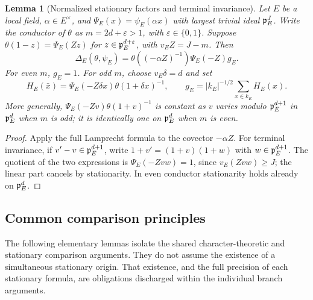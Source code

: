 \documentclass[11pt]{amsart}
\newtheorem{lemma}[theorem]{Lemma}
\theoremstyle{definition}
\theoremstyle{remark}
\begin{document}
\begin{lemma}[Normalized stationary factors and terminal invariance]
\label{U:stationary-factor}
Let $E$ be a local field, $\alpha\in E^\times$, and
$\Psi_E(x)=\psi_E(\alpha x)$ with largest trivial ideal $\mathfrak p_E^J$.
Write the conductor of $\theta$ as $m=2d+\varepsilon>1$, with
$\varepsilon\in\{0,1\}$. Suppose
$\theta(1-z)=\Psi_E(Zz)$ for $z\in\mathfrak p_E^{d+\varepsilon}$,
with $v_E Z=J-m$. Then
\begin{equation}\label{U:normalized-factor}
 \Delta_E(\theta,\psi_E)=
 \theta(( -\alpha Z)^{-1})\Psi_E(-Z)g_E.
\end{equation}
For even $m$, $g_E=1$. For odd $m$, choose $v_E\delta=d$ and set
\begin{equation}\label{U:normalized-residual}
 H_E(\bar x)=\Psi_E(-Z\delta x)\theta(1+\delta x)^{-1},\qquad
 g_E=|k_E|^{-1/2}\sum_{x\in k_E}H_E(x).
\end{equation}
More generally, $\Psi_E(-Zv)\theta(1+v)^{-1}$ is constant as $v$ varies
modulo $\mathfrak p_E^{d+1}$ in $\mathfrak p_E^d$ when $m$ is odd; it is identically
one on $\mathfrak p_E^d$ when $m$ is even.
\end{lemma}
\begin{proof}
Apply the full Lamprecht formula to the covector $-\alpha Z$.
For terminal invariance, if $v'-v\in\mathfrak p_E^{d+1}$, write
$1+v'=(1+v)(1+w)$ with $w\in\mathfrak p_E^{d+1}$. The quotient of the two
expressions is $\Psi_E(-Zvw)=1$, since
$v_E(Zvw)\ge J$; the linear part cancels by stationarity.
In even conductor stationarity holds already on $\mathfrak p_E^d$.
\end{proof}

\subsection{Common comparison principles}\label{U:common-principles}
The following elementary lemmas isolate the shared character-theoretic
and stationary comparison arguments. They do not assume the existence of a simultaneous stationary
origin. That existence, and the full precision of each stationary formula,
are obligations discharged within the individual branch arguments.
\end{document}
